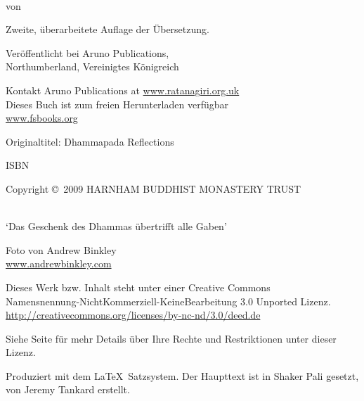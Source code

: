 \cleartoverso
\thispagestyle{empty}
\enlargethispage{\baselineskip}

{\copyrightsize\setlength{\parskip}{0.5\baselineskip}\setlength{\parindent}{0em}%
\raggedright%
\shaker\color[gray]{0.3}

\thetitle\\
von \theauthor

Zweite, überarbeitete Auflage der Übersetzung.

Veröffentlicht bei Aruno Publications,\\
Northumberland, Vereinigtes Königreich

Kontakt Aruno Publications at \href{http://ratanagiri.org.uk/}{www.ratanagiri.org.uk}\\
Dieses Buch ist zum freien Herunterladen verfügbar\\
\href{http://fsbooks.org/}{www.fsbooks.org}

Originaltitel: Dhammapada Reflections

ISBN \theISBN

Copyright \copyright\ 2009 HARNHAM BUDDHIST MONASTERY TRUST

\\
`Das Geschenk des Dhammas übertrifft alle Gaben'

Foto von Andrew Binkley\\
\href{http://andrewbinkley.com}{www.andrewbinkley.com}

{\tiny
Dieses Werk bzw. Inhalt steht unter einer Creative Commons\\
Namensnennung-NichtKommerziell-KeineBearbeitung 3.0 Unported Lizenz.\\
\href{http://creativecommons.org/licenses/by-nc-nd/3.0/deed.de}{http://creativecommons.org/licenses/by-nc-nd/3.0/deed.de}

Siehe Seite \pageref{copyright-details} für mehr Details über Ihre Rechte und Restriktionen unter dieser Lizenz.

Produziert mit dem \LaTeX\ Satzsystem. Der Haupttext ist in Shaker Pali gesetzt, von Jeremy Tankard erstellt.

\theEditionInfo

}}

